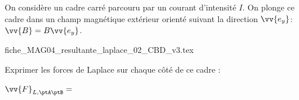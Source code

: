 
\finEntrainement














\newpage




\hauteurLargeurCadreReponse		{10mm}{5cm}
\typeEntrainement				{} %
\initialisationEntrainement

On considère un cadre carré parcouru par un courant d'intensité $I$. On plonge ce cadre dans un champ magnétique
extérieur orienté suivant la direction $\vv{e_y}$: $ \vv{B}=B\vv{e_{y}}$.


\begin{center}
{fiche_MAG04_resultante_laplace_02_CBD_v3.tex}
\end{center}


Exprimer les forces de Laplace sur chaque côté de ce cadre :

\debutEntrainement



\begin{enonce}
$\vv{F}_{L,\ptA\ptB}=$
\end{enonce}




